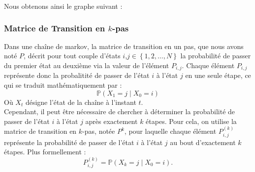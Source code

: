\documentclass{article}
\begin{document}
Nous obtenons ainsi le graphe suivant :

\begin{center}
\end{center}

\subsubsection{Matrice de Transition en \texorpdfstring{$k$}{k}-pas} %
Dans une chaîne de markov, la matrice de transition en un pas, que nous avons noté $P$, décrit pour tout couple d'états $i$,$j \in \left\{ 1, 2 , \ldots, N \right\}$ la probabilité de passer du premier état au deuxième via la valeur de l'élément $P_{i,j}$. Chaque élément $P_{i,j}$ représente donc la probalitité de passer de l'état $i$ à l'état $j$ en une seule étape, ce qui se traduit mathématiquement par :
\[
\mathbb{P}(X_1 = j \mid X_0 = i)
\]
Où $X_t$ désigne l'état de la chaîne à l'instant $t$. \\

Cependant, il peut être nécessaire de chercher à déterminer la probabilité de passer de l'état $i$ à l'état $j$ après exactement $k$ étapes. Pour cela, on utilise la matrice de transition en $k$-pas, notée $P^k$, pour laquelle chaque élément $P_{i,j}^{(k)}$ représente la probabilité de passer de l'état $i$ à l'état $j$ au bout d'exactement $k$ étapes. Plus formellement :
\[
P_{i,j}^{(k)} = \mathbb{P}(X_k = j \mid X_0 = i).
\]
\end{document}
